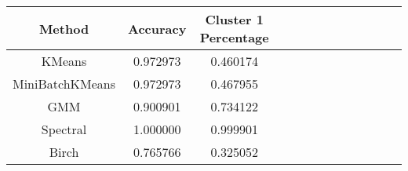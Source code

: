 \begin{tabular}{ccccccccccccc}
\toprule
         Method &  Accuracy &  Cluster 1 Percentage \\
\midrule
         KMeans &  0.972973 &              0.460174 \\
MiniBatchKMeans &  0.972973 &              0.467955 \\
            GMM &  0.900901 &              0.734122 \\
       Spectral &  1.000000 &              0.999901 \\
          Birch &  0.765766 &              0.325052 \\
\bottomrule
\end{tabular}
